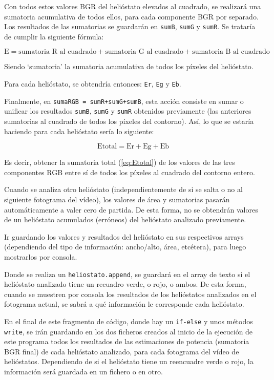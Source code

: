 Con todos estos valores BGR del helióstato elevados al cuadrado, se realizará una sumatoria acumulativa de todos ellos, para cada componente BGR por separado. Los resultados de las sumatorias se guardarán en \verb|sumB|, \verb|sumG| y \verb|sumR|. Se trataría de cumplir la siguiente fórmula:

\begin{equation}
\text{E} = \text{sumatoria R al cuadrado} + \text{sumatoria G al cuadrado} + \text{sumatoria B al cuadrado}
\label{eq:E}
\end{equation}

Siendo ‘sumatoria’ la sumatoria acumulativa de todos los píxeles del helióstato.

Para cada helióstato, se obtendría entonces: \verb|Er|, \verb|Eg| y \verb|Eb|.
           
Finalmente, en \verb|sumaRGB = sumR+sumG+sumB|, esta acción consiste en sumar o unificar los resultados \verb|sumB|, \verb|sumG| y \verb|sumR| obtenidos previamente (las anteriores sumatorias al cuadrado de todos los píxeles del contorno). Así, lo que se estaría haciendo para cada helióstato sería lo siguiente:

\begin{equation}
\text{Etotal} = \text{Er} + \text{Eg} + \text{Eb}
\label{eq:Etotal}
\end{equation}

Es decir, obtener la sumatoria total (\ref{eq:Etotal}) de los valores de las tres componentes RGB entre sí de todos los píxeles al cuadrado del contorno entero.

Cuando se analiza otro helióstato (independientemente de si se salta o no al siguiente fotograma del vídeo), los valores de área y sumatorias pasarán automáticamente a valer cero de partida. De esta forma, no se obtendrán valores de un helióstato acumulados (erróneos) del helióstato analizado previamente.

Ir guardando los valores y resultados del helióstato en sus respectivos arrays (dependiendo del tipo de información: ancho/alto, área, etcétera), para luego mostrarlos por consola.

Donde se realiza un \verb|heliostato.append|, se guardará en el array de texto si el helióstato analizado tiene un recuadro verde, o rojo, o ambos. De esta forma, cuando se muestren por consola los resultados de los helióstatos analizados en el fotograma actual, se sabrá a qué información le corresponde cada helióstato.

En el final de este fragmento de código, donde hay un \verb|if-else| y unos métodos \verb|write|, se irán guardando en los dos ficheros creados al inicio de la ejecución de este programa todos los resultados de las estimaciones de potencia (sumatoria BGR final) de cada helióstato analizado, para cada fotograma del vídeo de helióstatos. Dependiendo de si el helióstato tiene un reencuadre verde o rojo, la información será guardada en un fichero o en otro.

